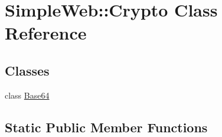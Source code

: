 \hypertarget{classSimpleWeb_1_1Crypto}{}\section{Simple\+Web\+:\+:Crypto Class Reference}
\label{classSimpleWeb_1_1Crypto}
\subsection*{Classes}
\begin{DoxyCompactItemize}
\item 
class \hyperlink{classSimpleWeb_1_1Crypto_1_1Base64}{Base64}
\end{DoxyCompactItemize}
\subsection*{Static Public Member Functions}
